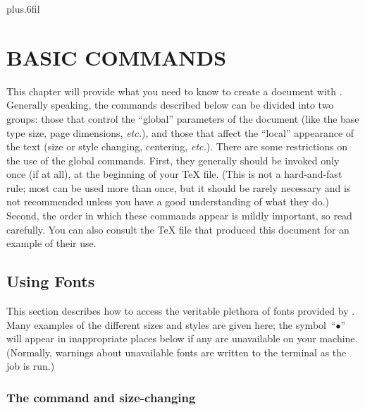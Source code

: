 

\null\vskip0pt plus.6fil


\newpage




{\bigfonts\bfs\chapter{BASIC COMMANDS}}

This chapter will provide what you need to know to create a document with
\jyTeX.  Generally speaking, the commands described below can be divided into
two groups: those that control the ``global'' parameters of the document (like
the base type size, page dimensions, {\it etc.}), and those that affect the
``local'' appearance of the text (size or style changing, centering, {\it
etc.}).  There are some restrictions on the use of the global commands.  First,
they generally should be invoked only once (if at all), at the beginning of
your \TeX{} file.  (This is not a hard-and-fast rule; most can be used more
than once, but it should be rarely necessary and is not recommended unless you
have a good understanding of what they do.)  Second, the order in which these
commands appear is mildly important, so read carefully.  You can also consult
the \TeX{} file that produced this document for an example of their use.


{\bigfonts\bfs\section{Using Fonts}}

This section describes how to access the veritable plethora of fonts provided
by \jyTeX.  Many examples of the different sizes and styles are given here; the
symbol~``$\bullet$'' will appear in inappropriate places below if any are
unavailable on your machine. (Normally, warnings about unavailable fonts are
written to the terminal as the job is run.)

{\sl\subsection{The\/ {\tt\string\typesize} command
     and size-changing}}

